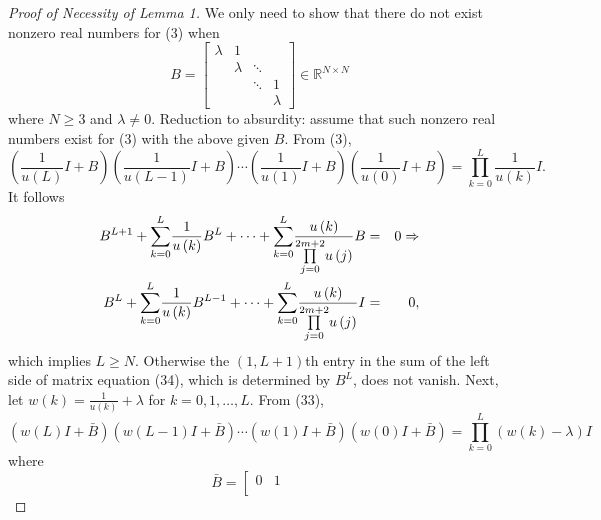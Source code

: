 \documentclass[journal,a4paper,12pt,onecolumn]{IEEEtran}
\begin{document}
$\left. {}\right. $

\begin{proof}[Proof of Necessity of Lemma 1]
We only need to show that there do not exist nonzero real numbers for (3)
when\begin{equation*}
B=\left[
\begin{array}{cccc}
\lambda & 1 &  &  \\
& \lambda & \ddots &  \\
&  & \ddots & 1 \\
&  &  & \lambda \end{array}\right] \in
\mathbb{R}
^{N\times N}
\end{equation*}where $N\geq 3$ and $\lambda \neq 0$. Reduction to absurdity: assume that
such nonzero real numbers exist for (3) with the above given $B$. From (3),\begin{equation}
\left( \frac{1}{u\left( L\right) }I+B\right) \left( \frac{1}{u\left(
L-1\right) }I+B\right) \cdots \left( \frac{1}{u\left( 1\right) }I+B\right)
\left( \frac{1}{u\left( 0\right) }I+B\right) =\overset{L}{\underset{k=0}{\prod }}\frac{1}{u\left( k\right) }I.
\end{equation}It follows\begin{eqnarray}
B^{L+1}+\overset{L}{\underset{k=0}{\sum }}\frac{1}{u\left( k\right) }B^{L}+\cdots +\overset{L}{\underset{k=0}{\sum }}\frac{u\left( k\right) }{\overset{2m+2}{\underset{j=0}{\prod }}u\left( j\right) }B &=&0\Rightarrow
\notag \\
B^{L}+\overset{L}{\underset{k=0}{\sum }}\frac{1}{u\left( k\right) }B^{L-1}+\cdots +\overset{L}{\underset{k=0}{\sum }}\frac{u\left( k\right) }{\overset{2m+2}{\underset{j=0}{\prod }}u\left( j\right) }I &=&0,
\end{eqnarray}which implies $L\geq N$. Otherwise the $\left( 1,L+1\right) $th entry in the
sum of the left side of matrix equation (34), which is determined by $B^{L}$, does not vanish. Next, let $w\left( k\right) =\frac{1}{u\left( k\right) }+\lambda $ for $k=0,1,\ldots ,L$. From (33),\begin{equation*}
\left( w\left( L\right) I+\bar{B}\right) \left( w\left( L-1\right) I+\bar{B}\right) \cdots \left( w\left( 1\right) I+\bar{B}\right) \left( w\left(
0\right) I+\bar{B}\right) =\overset{L}{\underset{k=0}{\prod }}\left( w\left(
k\right) -\lambda \right) I
\end{equation*}where\begin{equation}
\bar{B}=\left[
\begin{array}{cccc}
0 & 1 &  &  \\

\end{array}
\end{equation}
\end{proof}
\end{document}
